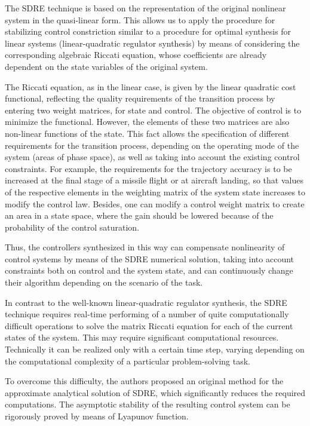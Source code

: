 \documentclass[review]{elsarticle}
\begin{document}
The SDRE technique is based on the representation of the original nonlinear system in the quasi-linear form. This allows us to apply the procedure for stabilizing control constriction similar to a procedure for optimal synthesis for linear systems (linear-quadratic regulator synthesis) by means of considering the corresponding algebraic Riccati equation, whose coefficients are already dependent on the state variables of the original system. 

The Riccati equation, as in the linear case, is given by the linear quadratic cost functional, reflecting the quality requirements of the transition process by entering two weight matrices, for state and control. The objective of control is to minimize the functional. However, the elements of these two matrices are also non-linear functions of the state. This fact allows the specification of different requirements for the transition process, depending on the operating mode of the system (areas of phase space), as well as taking into account the existing control constraints. For example, the requirements for the trajectory accuracy is to be increased at the final stage of a missile flight or at aircraft landing, so that values of the respective elements in the weighting matrix of the system state increases to modify the control law. Besides, one can modify a control weight matrix to create an area in a state space, where the gain should be lowered because of the probability of the control saturation.

Thus, the controllers synthesized in this way can compensate nonlinearity of control systems by means of the SDRE numerical solution, taking into account \cite{Cloutier2001,Cloutier2002} constraints both on control and the system state, and can continuously change their algorithm depending on the scenario of the task.

In contrast to the well-known linear-quadratic regulator synthesis, the SDRE technique requires real-time performing of a number of quite computationally difficult operations to solve the matrix Riccati equation for each of the current states of the system. This may require significant computational resources. Technically it can be realized only with a certain time step, varying depending on the computational complexity of a particular problem-solving task. 

To overcome this difficulty, the authors proposed an original method for the approximate analytical solution of SDRE, which significantly reduces the required computations. The asymptotic stability of the resulting control system can be rigorously proved by means of Lyapunov function. 
\end{document}
